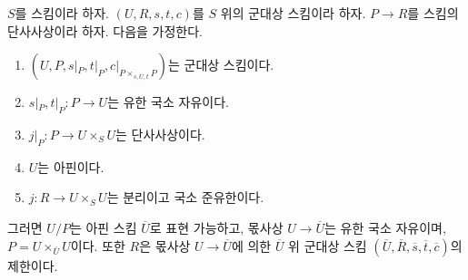 \begin{lemma}
\label{lemma-divide-subgroupoid}
$S$를 스킴이라 하자.
$(U, R, s, t, c)$를 $S$ 위의 군대상 스킴이라 하자.
$P \to R$를 스킴의 단사사상이라 하자. 다음을 가정한다.
\begin{enumerate}
\item $(U, P, s|_P, t|_P, c|_{P \times_{s, U, t}P})$는 군대상 스킴이다.
\item $s|_P, t|_P : P \to U$는 유한 국소 자유이다.
\item $j|_P : P \to U \times_S U$는 단사사상이다.
\item $U$는 아핀이다.
\item $j : R \to U \times_S U$는 분리이고 국소 준유한이다.
\end{enumerate}
그러면 $U/P$는 아핀 스킴 $\overline{U}$로 표현 가능하고, 몫사상
$U \to \overline{U}$는 유한 국소 자유이며,
$P = U \times_{\overline{U}} U$이다. 또한 $R$은 몫사상
$U \to \overline{U}$에 의한 $\overline{U}$ 위 군대상 스킴
$(\overline{U}, \overline{R}, \overline{s}, \overline{t}, \overline{c})$의
제한이다.
\end{lemma}

